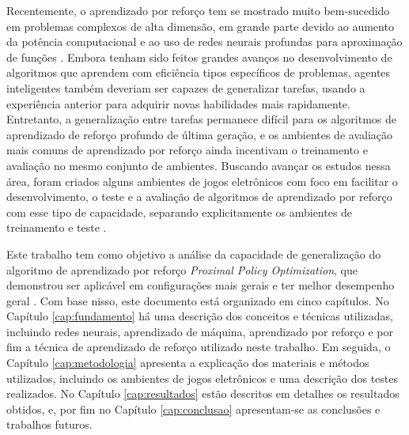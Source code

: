 Recentemente, o aprendizado por reforço tem se mostrado muito bem-sucedido em problemas complexos de alta dimensão, em grande parte devido ao aumento da potência computacional e ao uso de redes neurais profundas para aproximação de funções \cite{mnih13, mnih16, lillicrap15}. Embora tenham sido feitos grandes avanços no desenvolvimento de algoritmos que aprendem com eficiência tipos específicos de problemas, agentes inteligentes também deveriam ser capazes de generalizar tarefas, usando a experiência anterior para adquirir novas habilidades mais rapidamente. Entretanto, a generalização entre tarefas permanece difícil para os algoritmos de aprendizado de reforço profundo de última geração, e os ambientes de avaliação mais comuns de aprendizado por reforço ainda incentivam o treinamento e avaliação no mesmo conjunto de ambientes. Buscando avançar os estudos nessa área, foram criados alguns ambientes de jogos eletrônicos com foco em facilitar o desenvolvimento, o teste e a avaliação de algoritmos de aprendizado por reforço com esse tipo de capacidade, separando explicitamente os ambientes de treinamento e teste \cite{nichol18, Juliani19, torrado18}.

Este trabalho tem como objetivo a análise da capacidade de generalização do algoritmo de aprendizado por reforço \textit{Proximal Policy Optimization}, que demonstrou ser aplicável em configurações mais gerais e ter melhor desempenho geral \cite{Schulman17}. Com base nisso, este documento está organizado em cinco capítulos. No Capítulo \ref{cap:fundamento} há uma descrição dos conceitos e técnicas utilizadas, incluindo redes neurais, aprendizado de máquina, aprendizado por reforço e por fim a técnica de aprendizado de reforço utilizado neste trabalho. Em seguida, o Capítulo \ref{cap:metodologia} apresenta a explicação dos materiais e métodos utilizados, incluindo os ambientes de jogos eletrônicos e uma descrição dos testes realizados. No Capítulo \ref{cap:resultados} estão descritos em detalhes os resultados obtidos, e, por fim no Capítulo \ref{cap:conclusao} apresentam-se as conclusões e trabalhos futuros.
